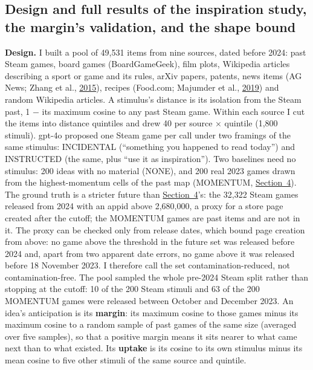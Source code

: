 \documentclass[
  10pt,
]{article}
\begin{document}
\subsection{Design and full results of the inspiration study, the margin's validation, and the shape bound}\label{app:C.2}

\textbf{Design.} I built a pool of
49,531 items from nine sources, dated
before 2024: past Steam games, board
games (BoardGameGeek), film plots,
Wikipedia articles describing a sport or
game and its rules, arXiv papers,
patents, news items (AG News; Zhang et
al., \hyperlink{ref-Zhang2015}{2015}),
recipes (Food.com; Majumder et al.,
\hyperlink{ref-Majumder2019}{2019}) and
random Wikipedia articles. A stimulus's
distance is its isolation from the Steam
past, 1 − its maximum cosine to any past
Steam game. Within each source I cut the
items into distance quintiles and drew
40 per source × quintile (1,800
stimuli). gpt-4o proposed one Steam game
per call under two framings of the same
stimulus: INCIDENTAL (``something you
happened to read today'') and INSTRUCTED
(the same, plus ``use it as
inspiration''). Two baselines need no
stimulus: 200 ideas with no material
(NONE), and 200 real 2023 games drawn
from the highest-momentum cells of the
past map (MOMENTUM,
\hyperref[sec:4]{Section~4}). The ground
truth is a stricter future than
\hyperref[sec:4]{Section~4}'s: the
32,322 Steam games released from 2024
with an appid above 2,680,000, a proxy
for a store page created after the
cutoff; the MOMENTUM games are past
items and are not in it. The proxy can
be checked only from release dates,
which bound page creation from above: no
game above the threshold in the future
set was released before 2024 and, apart
from two apparent date errors, no game
above it was released before 18 November
2023. I therefore call the set
contamination-reduced, not
contamination-free. The pool sampled the
whole pre-2024 Steam split rather than
stopping at the cutoff: 10 of the 200
Steam stimuli and 63 of the 200 MOMENTUM
games were released between October and
December 2023. An idea's anticipation is
its \textbf{margin}: its maximum cosine
to those games minus its maximum cosine
to a random sample of past games of the
same size (averaged over five samples),
so that a positive margin means it sits
nearer to what came next than to what
existed. Its \textbf{uptake} is its
cosine to its own stimulus minus its
mean cosine to five other stimuli of the
same source and quintile.
\end{document}
